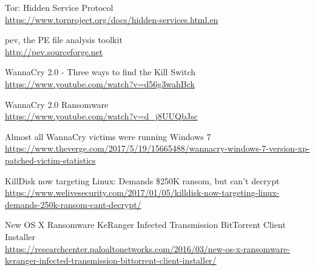 \documentclass[10pt,a4paper]{article}
\begin{document}
\begin{thebibliography}{1}
Tor: Hidden Service Protocol
\\\url{https://www.torproject.org/docs/hidden-services.html.en}

pev, the PE file analysis toolkit
\\\url{http://pev.sourceforge.net}

WannaCry 2.0 - Three ways to find the Kill Switch
\\\url{https://www.youtube.com/watch?v=d56g3wahBck}

WannaCry 2.0 Ransomware
\\\url{https://www.youtube.com/watch?v=d_j8UUQbJsc}

Almost all WannaCry victims were running Windows 7
\\\url{https://www.theverge.com/2017/5/19/15665488/wannacry-windows-7-version-xp-patched-victim-statistics}

KillDisk now targeting Linux: Demands \$250K ransom, but can’t decrypt
\\\url{https://www.welivesecurity.com/2017/01/05/killdisk-now-targeting-linux-demands-250k-ransom-cant-decrypt/}

New OS X Ransomware KeRanger Infected Transmission BitTorrent Client Installer
\\\url{https://researchcenter.paloaltonetworks.com/2016/03/new-os-x-ransomware-keranger-infected-transmission-bittorrent-client-installer/}

\end{thebibliography}
\end{document}
